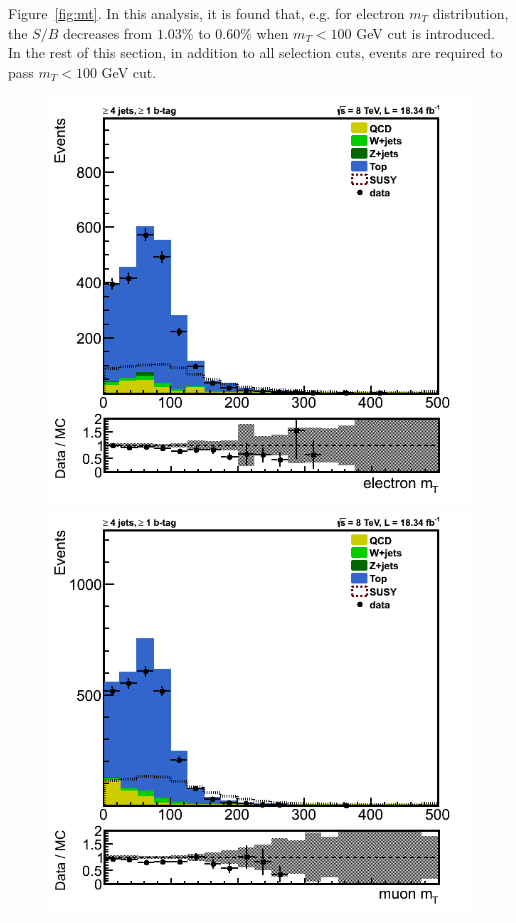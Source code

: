 Figure~\ref{fig:mt}. In this analysis, 
it is found that, e.g. for electron $m_T$ distribution, the $S/B$ decreases from $1.03\%$ to $0.60\%$ when $m_T<100$ GeV cut is introduced. In 
the rest of this section, in addition to all selection cuts, events are required to pass $m_T<100$ GeV cut.\\ 
\begin{figure}[htbp] 
\centering
\includegraphics[angle=0,scale=0.35]{llplots_20Invfb/ele_mt.png} 
\includegraphics[angle=0,scale=0.35]{llplots_20Invfb/mu_mt.png} \\

\end{figure}
